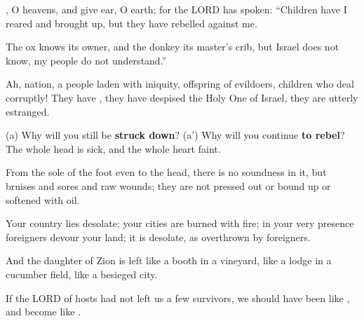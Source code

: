 \documentclass[11pt]{article}
\begin{document}
\begin{biblicaloutline}[Isaiah 1:2-9]
    

    \begin{versesection}{2em}
         , O heavens, and \textcolor{highlightgreen}{give ear}, O earth;
        \poetryline for the LORD has spoken:
 ``Children have I reared and brought up,
\poetryline but they have rebelled against me.

  The ox knows its owner,
\poetryline and the donkey its master's crib,
but Israel does not know,
\poetryline my people do not understand.''

 Ah,  nation,
\poetryline a people laden with iniquity,
offspring of evildoers,
\poetryline children who deal corruptly!
They have ,
\poetryline they have despised the Holy One of Israel,
\poetryline they are utterly estranged.
    \end{versesection}
    
    
    \begin{versesection}{2em}
         (a) Why will you still be \textbf{struck down}?
        \poetryline (a') Why will you continue \textbf{to rebel}?
        The whole head is sick,
        \poetryline and the whole heart faint.
        
         From the sole of the foot even to the head,
        \poetryline there is no soundness in it,
        but bruises and sores
        \poetryline and raw wounds;
        they are not pressed out or bound up
        \poetryline or softened with oil.
    \end{versesection}
    
    
    \begin{versesection}{2em}
         Your country lies desolate;
        \poetryline your cities are burned with fire;
        in your very presence
        \poetryline foreigners devour your land;
        \poetryline it is desolate, as \textcolor{highlightred}{overthrown} by foreigners.
        
         And the daughter of Zion is left
        \poetryline like a booth in a vineyard,
        like a lodge in a cucumber field,
        \poetryline like a besieged city.

         If the LORD of hosts
        \poetryline had not left us a few survivors,
        we should have been like ,
        \poetryline and become like .
    \end{versesection}

\end{biblicaloutline}
\end{document}
